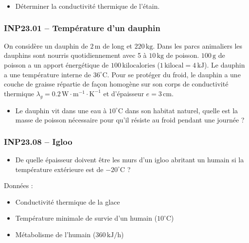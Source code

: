 \begin{itemize}[label=\textbullet]
\item Déterminer la conductivité thermique de l'étain.
\end{itemize}

\newpage
\subsubsection*{INP23.01 -- Température d'un dauphin }

On considère un dauphin de $2\,\text{m}$ de long et $220\,\text{kg}$. Dans les parcs animaliers les dauphins sont nourris quotidiennement avec 5 à $10\,\text{kg}$ de poisson. $100\,\text{g}$ de poisson a un apport énergétique de $100\,\text{kilocalories}$ ($1\,\text{kilocal}=4\,\text{kJ}$). Le dauphin a une température interne de $36^\circ\text{C}$. Pour se protéger du froid, le dauphin a une couche de graisse répartie de façon homogène sur son corps de conductivité thermique $\lambda_{g} = 0.2\,\text{W}\cdot\text{m}^{-1}\cdot\text{K}^{-1}$ et d'épaisseur $e = 3\,\text{cm}$.

\begin{itemize}[label=\textbullet]
\item Le dauphin vit dans une eau à $10^\circ\text{C}$ dans son habitat naturel, quelle est la masse de poisson nécessaire pour qu'il résiste au froid pendant une journée ?
\end{itemize}

\subsubsection*{INP23.08 -- Igloo}

\begin{itemize}[label=\textbullet]
\item De quelle épaisseur doivent être les murs d'un igloo abritant un humain si la température extérieure est de $-20^\circ\text{C}$ ?
\end{itemize}

Données :
\begin{itemize}
\item Conductivité thermique de la glace
\item Température minimale de survie d'un humain ($10^\circ\text{C}$)
\item Métabolisme de l'humain ($360\,\text{kJ/h}$)
\end{itemize}


